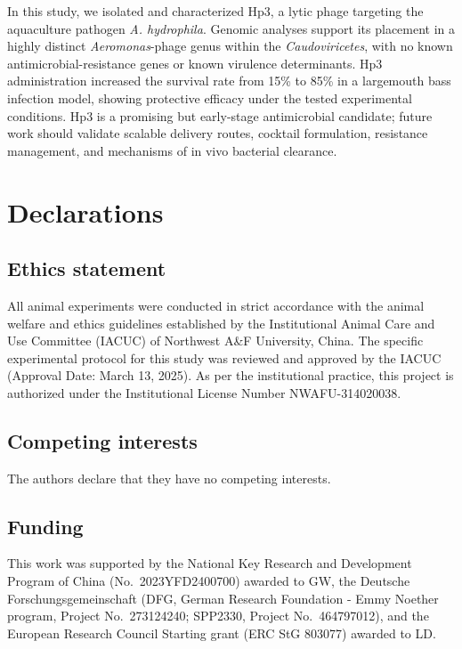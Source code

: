 In this study, we isolated and characterized Hp3, a lytic phage targeting
the aquaculture pathogen \emph{A. hydrophila}. Genomic analyses support
its placement in a highly distinct \emph{Aeromonas}-phage genus within
the \emph{Caudoviricetes}, with no known antimicrobial-resistance genes
or known virulence determinants. Hp3 administration increased
the survival rate from 15\% to 85\% in a largemouth bass infection
model, showing protective efficacy under the tested experimental
conditions. Hp3 is a promising but early-stage
antimicrobial candidate; future work should validate scalable delivery
routes, cocktail formulation, resistance management, and mechanisms of
in vivo bacterial clearance.



\section{Declarations}\label{declarations}

\subsection{Ethics statement}\label{ethics-statement}

All animal experiments were conducted in strict accordance with the
animal welfare and ethics guidelines established by the Institutional
Animal Care and Use Committee (IACUC) of Northwest A\&F University,
China. The specific experimental protocol for this study was reviewed
and approved by the IACUC (Approval Date: March 13, 2025). As per the
institutional practice, this project is authorized under the
Institutional License Number NWAFU-314020038.

\subsection{Competing interests}\label{competing-interests}

The authors declare that they have no competing interests.

\subsection{Funding}\label{funding}

This work was supported by the National Key Research and Development
Program of China (No.~2023YFD2400700) awarded to GW, the Deutsche
Forschungsgemeinschaft (DFG, German Research Foundation - Emmy Noether
program, Project No.~273124240; SPP2330, Project No.~464797012), and the
European Research Council Starting grant (ERC StG 803077) awarded to LD.

